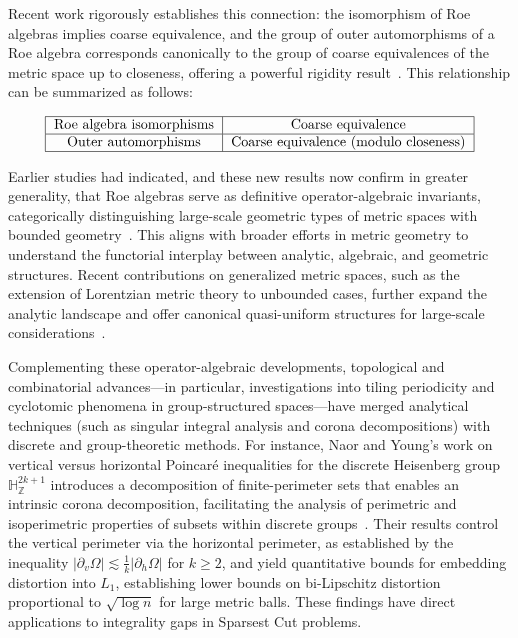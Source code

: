 \documentclass[sigconf]{acmart}
\begin{document}
Recent work rigorously establishes this connection: the isomorphism of Roe algebras implies coarse equivalence, and the group of outer automorphisms of a Roe algebra corresponds canonically to the group of coarse equivalences of the metric space up to closeness, offering a powerful rigidity result~\cite{ref52}. This relationship can be summarized as follows:

\[
\begin{tabular}{|c|c|}
\hline
\text{Roe algebra isomorphisms} & \text{Coarse equivalence} \\
\hline
\text{Outer automorphisms} & \text{Coarse equivalence (modulo closeness)} \\
\hline
\end{tabular}
\]

Earlier studies had indicated, and these new results now confirm in greater generality, that Roe algebras serve as definitive operator-algebraic invariants, categorically distinguishing large-scale geometric types of metric spaces with bounded geometry~\cite{ref52}. This aligns with broader efforts in metric geometry to understand the functorial interplay between analytic, algebraic, and geometric structures. Recent contributions on generalized metric spaces, such as the extension of Lorentzian metric theory to unbounded cases, further expand the analytic landscape and offer canonical quasi-uniform structures for large-scale considerations~\cite{ref51}.

Complementing these operator-algebraic developments, topological and combinatorial advances—in particular, investigations into tiling periodicity and cyclotomic phenomena in group-structured spaces—have merged analytical techniques (such as singular integral analysis and corona decompositions) with discrete and group-theoretic methods. For instance, Naor and Young's work on vertical versus horizontal Poincaré inequalities for the discrete Heisenberg group $\mathbb{H}_{\mathbb{Z}}^{2k+1}$ introduces a decomposition of finite-perimeter sets that enables an intrinsic corona decomposition, facilitating the analysis of perimetric and isoperimetric properties of subsets within discrete groups~\cite{ref108}. Their results control the vertical perimeter via the horizontal perimeter, as established by the inequality $|\partial_{v}\Omega|\lesssim \frac{1}{k}|\partial_{h}\Omega|$ for $k\geq2$, and yield quantitative bounds for embedding distortion into $L_1$, establishing lower bounds on bi-Lipschitz distortion proportional to $\sqrt{\log n}$ for large metric balls. These findings have direct applications to integrality gaps in Sparsest Cut problems.
\end{document}
